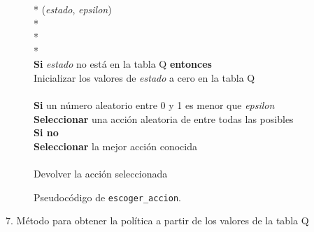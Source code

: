 \documentclass[conference,a4paper]{IEEEtran}
\begin{document}
\begin{figure}[h]
  \begin{pseudo}*
    (\textit{estado}, \textit{epsilon}) \\*
     \\*
     \\*
    \\
    \textbf{Si} \textit{estado} no está en la tabla Q \textbf{entonces} \\
    \> Inicializar los valores de \textit{estado} a cero en la tabla Q \\
    \\
    \textbf{Si} un número aleatorio entre 0 y 1 es menor que \textit{epsilon}\\
    \> \textbf{Seleccionar} una acción aleatoria de entre todas las posibles \\
    \textbf{Si no} \\
    \> \textbf{Seleccionar} la mejor acción conocida \\
    \\
    Devolver la acción seleccionada
  \end{pseudo}
  \caption{Pseudocódigo de \texttt{escoger\_accion}.}
  \label{fig:escoger_accion}
\end{figure}

7. Método para obtener la política a partir de los valores de la tabla Q\newline\newline\newline\newline\newline\newline\newline\newline
\end{document}
